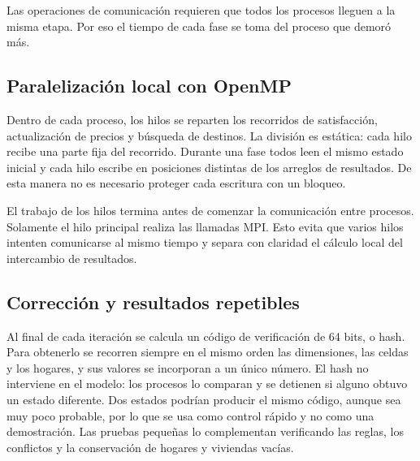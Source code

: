 Las operaciones de comunicación requieren que todos los procesos lleguen a la misma etapa. Por eso el tiempo de cada fase se toma del proceso que demoró más.

\subsection{Paralelización local con OpenMP}

Dentro de cada proceso, los hilos se reparten los recorridos de satisfacción, actualización de precios y búsqueda de destinos. La división es estática: cada hilo recibe una parte fija del recorrido. Durante una fase todos leen el mismo estado inicial y cada hilo escribe en posiciones distintas de los arreglos de resultados. De esta manera no es necesario proteger cada escritura con un bloqueo.

El trabajo de los hilos termina antes de comenzar la comunicación entre procesos. Solamente el hilo principal realiza las llamadas MPI. Esto evita que varios hilos intenten comunicarse al mismo tiempo y separa con claridad el cálculo local del intercambio de resultados.

\subsection{Corrección y resultados repetibles}

Al final de cada iteración se calcula un código de verificación de 64 bits, o hash. Para obtenerlo se recorren siempre en el mismo orden las dimensiones, las celdas y los hogares, y sus valores se incorporan a un único número. El hash no interviene en el modelo: los procesos lo comparan y se detienen si alguno obtuvo un estado diferente. Dos estados podrían producir el mismo código, aunque sea muy poco probable, por lo que se usa como control rápido y no como una demostración. Las pruebas pequeñas lo complementan verificando las reglas, los conflictos y la conservación de hogares y viviendas vacías.
